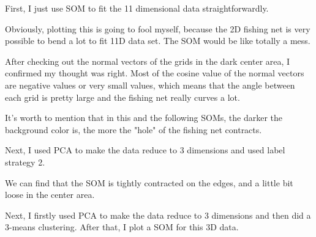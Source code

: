 \documentclass[titlepage,a4paper,12pt,thmsb]{report}
\begin{document}
First, I just use SOM to fit the 11 dimensional data straightforwardly.

Obviously, plotting this is going to fool myself, because the 2D fishing net is very possible to bend a lot to fit 11D data set. The SOM would be like totally a mess.

After checking out the normal vectors of the grids in the dark center area, I confirmed my thought was right. Most of the cosine value of the normal vectors are negative values or very small values, which means that the angle between each grid is pretty large and the fishing net really curves a lot.

It's worth to mention that in this and the following SOMs, the darker the background color is, the more the "hole" of the fishing net contracts.



\begin{center}
\begin{figure}[h]
{\par}
\end{figure}
{}
\end{center}

\newpage

Next, I used PCA to make the data reduce to 3 dimensions and used label strategy 2.

\begin{center}
\begin{figure}[h]
{\par}
\end{figure}
{}
\end{center}

\begin{center}
\begin{figure}[h]
{\par}
\end{figure}
{}
\end{center}

We can find that the SOM is tightly contracted on the edges, and a little bit loose in the center area.

\newpage

Next, I firstly used PCA to make the data reduce to 3 dimensions and then did a 3-means clustering. After that, I plot a SOM for this 3D data.
\end{document}
